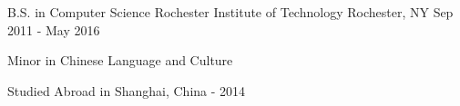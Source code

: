 
\begin{cventries}

  \cventry
    {B.S. in Computer Science}
    {Rochester Institute of Technology}
    {Rochester, NY}
    {Sep 2011 - May 2016}
    {
      \begin{cvitems}
        \item {Minor in Chinese Language and Culture}
        \item {Studied Abroad in Shanghai, China - 2014 }
      \end{cvitems}
    }

\end{cventries}
